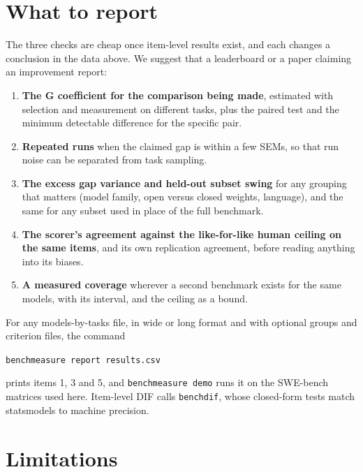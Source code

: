 \documentclass[11pt]{article}
\begin{document}
\section{What to report}

The three checks are cheap once item-level results exist, and each changes a conclusion in the data above. We suggest that a leaderboard or a paper claiming an improvement report:
\begin{enumerate}
\item \textbf{The G coefficient for the comparison being made}, estimated with selection and measurement on different tasks, plus the paired test and the minimum detectable difference for the specific pair.
\item \textbf{Repeated runs} when the claimed gap is within a few SEMs, so that run noise can be separated from task sampling.
\item \textbf{The excess gap variance and held-out subset swing} for any grouping that matters (model family, open versus closed weights, language), and the same for any subset used in place of the full benchmark.
\item \textbf{The scorer's agreement against the like-for-like human ceiling on the same items}, and its own replication agreement, before reading anything into its biases.
\item \textbf{A measured coverage} wherever a second benchmark exists for the same models, with its interval, and the ceiling as a bound.
\end{enumerate}
For any models-by-tasks file, in wide or long format and with optional groups and criterion files, the command
\begin{center}\texttt{benchmeasure report results.csv}\end{center}
prints items 1, 3 and 5, and \texttt{benchmeasure demo} runs it on the SWE-bench matrices used here. Item-level DIF calls \texttt{benchdif}, whose closed-form tests match statsmodels to machine precision.

\section{Limitations}
\end{document}
